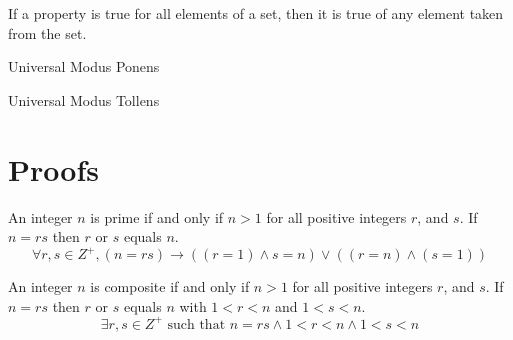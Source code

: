 \documentclass[11pt]{article}
\begin{document}
\begin{definition}\label{def:universal-instantiation}
    If a property is true for all elements of a set, then it is true of any element taken from the set.
\end{definition}

\begin{bbox}{\centering Universal Modus Ponens}
    \begin{center}
        \begin{argument}
    \end{argument}
    \end{center}
\end{bbox}

\begin{bbox}{\centering Universal Modus Tollens}
    \begin{center}
        \begin{argument}
    \end{argument}
    \end{center}
\end{bbox}

\section{Proofs}

\begin{definition}[Prime]\label{def:prime}
    An integer $n$ is prime if and only if $n > 1$ for all positive integers $r$, and $s$.
    If $n = rs$ then $r$ or $s$ equals $n$.
    \begin{equation*}
    \forall r,s \in Z^+, (n = rs) \to ((r = 1) \land s = n) \lor ((r = n) \land (s = 1))
    \end{equation*}
\end{definition}

\begin{definition}[Composite]\label{def:composite}
    An integer $n$ is composite if and only if $n > 1$ for all positive integers $r$, and $s$.
    If $n = rs$ then $r$ or $s$ equals $n$ with $1 < r < n$ and $1 < s < n$.
    \begin{equation*}
        \exists r,s \in Z^+ \text{ such that } n = rs \land 1 < r < n \land 1 < s < n
    \end{equation*}
\end{definition}
\end{document}
